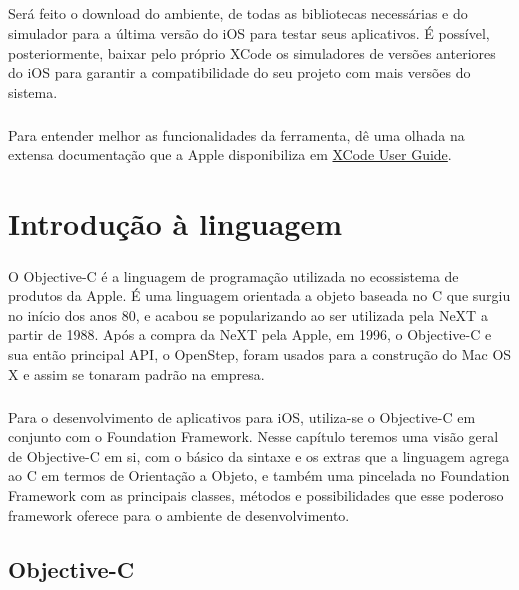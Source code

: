 \documentclass[a4paper,12pt,brazil,doubleside]{book}
\begin{document}
\paragraph{}Será feito o download do ambiente, de todas as bibliotecas necessárias e do simulador para a última versão do iOS para testar seus aplicativos. É possível, posteriormente, baixar pelo próprio XCode os simuladores de versões anteriores do iOS para garantir a compatibilidade do seu projeto com mais versões do sistema.
\paragraph{}Para entender melhor as funcionalidades da ferramenta, dê uma olhada na extensa documentação que a Apple disponibiliza em 
\href{https://developer.apple.com/library/ios/#documentation/ToolsLanguages/Conceptual/Xcode_User_Guide}{XCode User Guide}.



\chapter{Introdução à linguagem}

\paragraph{}O Objective-C é a linguagem de programação utilizada no ecossistema de produtos da Apple. É uma linguagem orientada a objeto baseada no C que surgiu no início dos anos 80, e acabou se popularizando ao ser utilizada pela NeXT a partir de 1988. Após a compra da NeXT pela Apple, em 1996, o Objective-C e sua então principal API, o OpenStep, foram usados para a construção do Mac OS X e assim se tonaram padrão na empresa.
\paragraph{}Para o desenvolvimento de aplicativos para iOS, utiliza-se o Objective-C em conjunto com o Foundation Framework. Nesse capítulo teremos uma visão geral de Objective-C em si, com o básico da sintaxe e os extras que a linguagem agrega ao C em termos de Orientação a Objeto, e também uma pincelada no Foundation Framework com as principais classes, métodos e possibilidades que esse poderoso framework oferece para o ambiente de desenvolvimento.

\bigskip 
\bigskip


\section{Objective-C}
\end{document}
